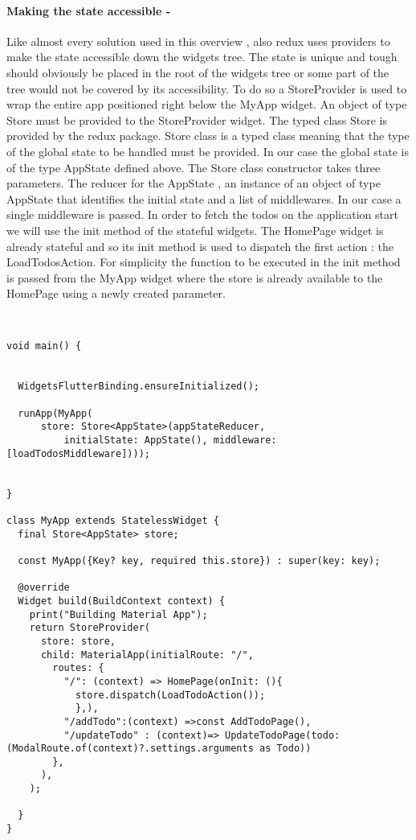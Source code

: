 \paragraph{Making the state accessible - }
\label{subpar:todo_app_bloc_core_state}
Like almost every solution used in this overview , also redux uses providers to make the state accessible down the widgets tree. The state is unique and tough should obviously be placed in the root of the widgets tree or some part of the tree would not be covered by its accessibility. To do so a StoreProvider is used to wrap the entire app positioned right below the MyApp widget. An object of type Store must be provided to the StoreProvider widget. The typed class Store is provided by the redux package. Store class is a typed class meaning that the type of the global state to be handled must be provided. In our case the global state is of the type AppState defined above. The Store class constructor takes three parameters. The reducer for the AppState , an instance of an object of type AppState that identifies the initial state and a list of middlewares. In our case a single middleware is passed. In order to fetch the todos on the application start we will use the init method of the stateful widgets.  The HomePage widget is already stateful and so its init method is used to dispatch the first action : the LoadTodosAction. For simplicity the function to be executed in the init method is passed from the MyApp widget where the store is already available to the HomePage using a newly created parameter.
\begin{code}
\mbox{}\\
 \mbox{}
		\label{code:2.14}
\begin{verbatim}
void main() {


  WidgetsFlutterBinding.ensureInitialized();

  runApp(MyApp(
      store: Store<AppState>(appStateReducer,
          initialState: AppState(), middleware: [loadTodosMiddleware])));


}

class MyApp extends StatelessWidget {
  final Store<AppState> store;

  const MyApp({Key? key, required this.store}) : super(key: key);

  @override
  Widget build(BuildContext context) {
    print("Building Material App");
    return StoreProvider(
      store: store,
      child: MaterialApp(initialRoute: "/",
        routes: {
          "/": (context) => HomePage(onInit: (){
            store.dispatch(LoadTodoAction());
            },),
          "/addTodo":(context) =>const AddTodoPage(),
          "/updateTodo" : (context)=> UpdateTodoPage(todo: (ModalRoute.of(context)?.settings.arguments as Todo))
        },
      ),
    );

  }
}
\end{verbatim}
\mbox{}
\end{code}

